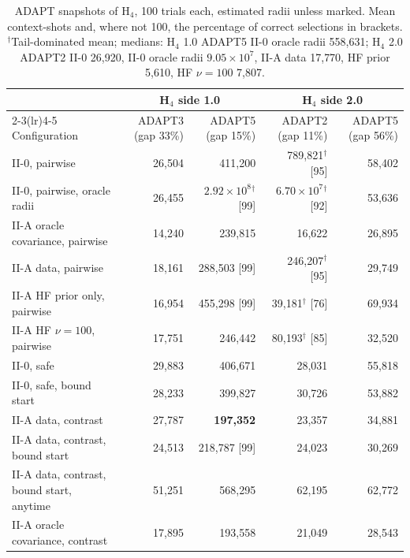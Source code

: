 \documentclass[10.5pt]{article}
\newcommand{\sci}[2]{$#1\times10^{#2}$}
\begin{document}
\begin{table}[!ht]
\centering\footnotesize
\caption{ADAPT snapshots of H$_4$, 100 trials each, estimated radii unless marked. Mean context-shots and, where not 100, the percentage of correct selections in brackets. $^\dagger$Tail-dominated mean; medians: H$_4$ 1.0 ADAPT5 II-0 oracle radii 558{,}631; H$_4$ 2.0 ADAPT2 II-0 26{,}920, II-0 oracle radii \sci{9.05}{7}, II-A data 17{,}770, HF prior 5{,}610, HF $\nu=100$ 7{,}807.}
\label{tab:snapshots}
\setlength{\tabcolsep}{3pt}
\begin{tabular}{lrrrr}
\toprule
 & \multicolumn{2}{c}{H$_4$ side 1.0} & \multicolumn{2}{c}{H$_4$ side 2.0} \\
\cmidrule(lr){2-3}\cmidrule(lr){4-5}
Configuration & ADAPT3 (gap 33\%) & ADAPT5 (gap 15\%) & ADAPT2 (gap 11\%) & ADAPT5 (gap 56\%) \\
\midrule
II-0, pairwise & 26,504 & 411,200 & 789,821$^\dagger$ [95] & 58,402 \\
II-0, pairwise, oracle radii & 26,455 & \sci{2.92}{8}$^\dagger$ [99] & \sci{6.70}{7}$^\dagger$ [92] & 53,636 \\
II-A oracle covariance, pairwise & 14,240 & 239,815 & 16,622 & 26,895 \\
II-A data, pairwise & 18,161 & 288,503 [99] & 246,207$^\dagger$ [95] & 29,749 \\
II-A HF prior only, pairwise & 16,954 & 455,298 [99] & 39,181$^\dagger$ [76] & 69,934 \\
II-A HF $\nu=100$, pairwise & 17,751 & 246,442 & 80,193$^\dagger$ [85] & 32,520 \\
\midrule
II-0, safe & 29,883 & 406,671 & 28,031 & 55,818 \\
II-0, safe, bound start & 28,233 & 399,827 & 30,726 & 53,882 \\
II-A data, contrast & 27,787 & \textbf{197,352} & 23,357 & 34,881 \\
II-A data, contrast, bound start & 24,513 & 218,787 [99] & 24,023 & 30,269 \\
II-A data, contrast, bound start, anytime & 51,251 & 568,295 & 62,195 & 62,772 \\
II-A oracle covariance, contrast & 17,895 & 193,558 & 21,049 & 28,543 \\
\bottomrule
\end{tabular}
\end{table}
\end{document}
